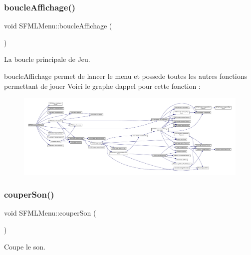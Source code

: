 \subsubsection{\texorpdfstring{boucle\+Affichage()}{boucleAffichage()}}
{\footnotesize\ttfamily void S\+F\+M\+L\+Menu\+::boucle\+Affichage (\begin{DoxyParamCaption}{ }\end{DoxyParamCaption})}



La boucle principale de Jeu. 

boucle\+Affichage permet de lancer le menu et possede toutes les autres fonctions permettant de jouer Voici le graphe d\textquotesingle{}appel pour cette fonction \+:\nopagebreak
\begin{figure}[H]
\begin{center}
\leavevmode
\includegraphics[width=350pt]{class_s_f_m_l_menu_ab7eeb1a042f076ec28ce301c1d8d3660_cgraph}
\end{center}
\end{figure}
\mbox{\label{class_s_f_m_l_menu_a05f9dda2fac7c0c0a354c5caa5faccb5}} 
\subsubsection{\texorpdfstring{couper\+Son()}{couperSon()}}
{\footnotesize\ttfamily void S\+F\+M\+L\+Menu\+::couper\+Son (\begin{DoxyParamCaption}{ }\end{DoxyParamCaption})\hspace{0.3cm}{\ttfamily [private]}}



Coupe le son. 

